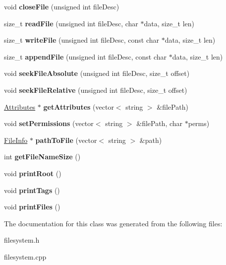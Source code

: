 \begin{DoxyCompactItemize}
void {\bfseries close\+File} (unsigned int file\+Desc)
\item 
\mbox{\label{classFileSystem_ae8d0b2314a26136a09e2edceab68fae1}} 
size\+\_\+t {\bfseries read\+File} (unsigned int file\+Desc, char $\ast$data, size\+\_\+t len)
\item 
\mbox{\label{classFileSystem_ad8f59355b3eec94ee8fb88acb4179c69}} 
size\+\_\+t {\bfseries write\+File} (unsigned int file\+Desc, const char $\ast$data, size\+\_\+t len)
\item 
\mbox{\label{classFileSystem_a34ef1d823d338aa7190a4acf137a015d}} 
size\+\_\+t {\bfseries append\+File} (unsigned int file\+Desc, const char $\ast$data, size\+\_\+t len)
\item 
\mbox{\label{classFileSystem_ae7e60d804eddbb5552cbbcec3d48483e}} 
void {\bfseries seek\+File\+Absolute} (unsigned int file\+Desc, size\+\_\+t offset)
\item 
\mbox{\label{classFileSystem_ab1c0196f975bd9afe3912bdb11b73a0f}} 
void {\bfseries seek\+File\+Relative} (unsigned int file\+Desc, size\+\_\+t offset)
\item 
\mbox{\label{classFileSystem_aa95e4a2637d1aaca39f1672fc98345b5}} 
\mbox{\hyperlink{classAttributes}{Attributes}} $\ast$ {\bfseries get\+Attributes} (vector$<$ string $>$ \&file\+Path)
\item 
\mbox{\label{classFileSystem_ab4d83c124999807d6ea9ff76e95dac06}} 
void {\bfseries set\+Permissions} (vector$<$ string $>$ \&file\+Path, char $\ast$perms)
\item 
\mbox{\label{classFileSystem_a33e11c3a6b9eeda2e85c8e61b50ddeed}} 
\mbox{\hyperlink{classFileInfo}{File\+Info}} $\ast$ {\bfseries path\+To\+File} (vector$<$ string $>$ \&path)
\item 
\mbox{\label{classFileSystem_a4c23a9aab388ac27008682e3977672e3}} 
int {\bfseries get\+File\+Name\+Size} ()
\item 
\mbox{\label{classFileSystem_af6adc05d57f715de07432a897070eec4}} 
void {\bfseries print\+Root} ()
\item 
\mbox{\label{classFileSystem_a4caa6452a78caf023ff522c5846f1391}} 
void {\bfseries print\+Tags} ()
\item 
\mbox{\label{classFileSystem_a0bc788485811b7307193ee282ff5ba53}} 
void {\bfseries print\+Files} ()
\end{DoxyCompactItemize}


The documentation for this class was generated from the following files\+:\begin{DoxyCompactItemize}
\item 
filesystem.\+h\item 
filesystem.\+cpp\end{DoxyCompactItemize}
